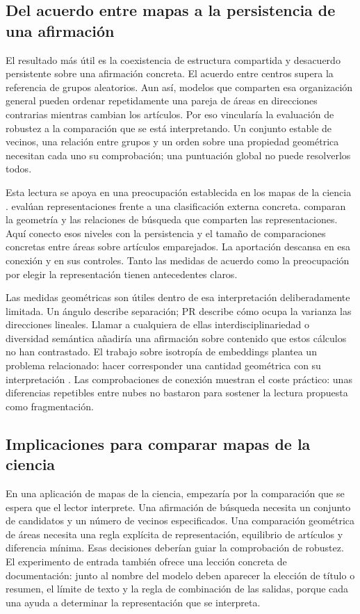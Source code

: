 \documentclass[12pt]{article}
\begin{document}
\subsection{Del acuerdo entre mapas a la persistencia de una afirmación}
El resultado más útil es la coexistencia de estructura compartida y desacuerdo persistente sobre una afirmación concreta. El acuerdo entre centros supera la referencia de grupos aleatorios. Aun así, modelos que comparten esa organización general pueden ordenar repetidamente una pareja de áreas en direcciones contrarias mientras cambian los artículos. Por eso vincularía la evaluación de robustez a la comparación que se está interpretando. Un conjunto estable de vecinos, una relación entre grupos y un orden sobre una propiedad geométrica necesitan cada uno su comprobación; una puntuación global no puede resolverlos todos.

Esta lectura se apoya en una preocupación establecida en los mapas de la ciencia \citep{refa0d2d707e6,ref6a2f5912bc}. \citet{refc0e2cc29e0} evalúan representaciones frente a una clasificación externa concreta. \citet{ref4e1e0d5582} comparan la geometría y las relaciones de búsqueda que comparten las representaciones. Aquí conecto esos niveles con la persistencia y el tamaño de comparaciones concretas entre áreas sobre artículos emparejados. La aportación descansa en esa conexión y en sus controles. Tanto las medidas de acuerdo como la preocupación por elegir la representación tienen antecedentes claros.

Las medidas geométricas son útiles dentro de esa interpretación deliberadamente limitada. Un ángulo describe separación; PR describe cómo ocupa la varianza las direcciones lineales. Llamar a cualquiera de ellas interdisciplinariedad o diversidad semántica añadiría una afirmación sobre contenido que estos cálculos no han contrastado. El trabajo sobre isotropía de embeddings plantea un problema relacionado: hacer corresponder una cantidad geométrica con su interpretación \citep{rudman-etal-2022-isoscore}. Las comprobaciones de conexión muestran el coste práctico: unas diferencias repetibles entre nubes no bastaron para sostener la lectura propuesta como fragmentación.

\subsection{Implicaciones para comparar mapas de la ciencia}
En una aplicación de mapas de la ciencia, empezaría por la comparación que se espera que el lector interprete. Una afirmación de búsqueda necesita un conjunto de candidatos y un número de vecinos especificados. Una comparación geométrica de áreas necesita una regla explícita de representación, equilibrio de artículos y diferencia mínima. Esas decisiones deberían guiar la comprobación de robustez. El experimento de entrada también ofrece una lección concreta de documentación: junto al nombre del modelo deben aparecer la elección de título o resumen, el límite de texto y la regla de combinación de las salidas, porque cada una ayuda a determinar la representación que se interpreta.
\end{document}

